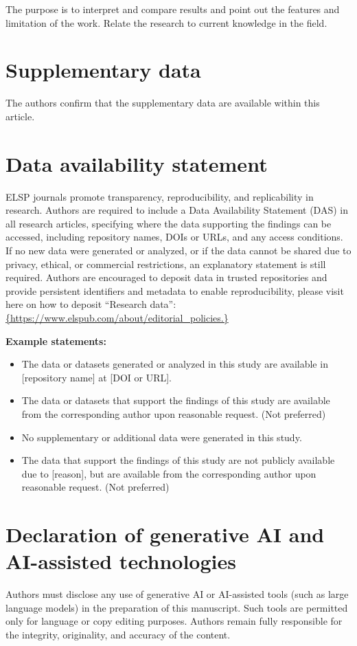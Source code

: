 \documentclass{ELSP}
\begin{document}
The purpose is to interpret and compare results and point out the
features and limitation of the work. Relate the research to current
knowledge in the field.

\section*{Supplementary data}

The authors confirm that the supplementary data are available within this article.

\section*{Data availability statement}
ELSP journals promote transparency, reproducibility, and replicability in research. Authors are required to include a Data Availability Statement (DAS) in all research articles, specifying where the data supporting the findings can be accessed, including repository names, DOIs or URLs, and any access conditions. If no new data were generated or analyzed, or if the data cannot be shared due to privacy, ethical, or commercial restrictions, an explanatory statement is still required. Authors are encouraged to deposit data in trusted repositories and provide persistent identifiers and metadata to enable reproducibility, please visit here on how to deposit “Research data”: \url{{https://www.elspub.com/about/editorial_policies.}}

\vspace{+12pt}
\noindent\textbf{{Example statements:}}
\vspace{+12pt}
\begin{itemize}
\item The data or datasets generated or analyzed in this study are available in [repository name] at [DOI or URL].
\item The data or datasets that support the findings of this study are available from the corresponding author upon reasonable request. (Not preferred)
\item No supplementary or additional data were generated in this study. 
\item The data that support the findings of this study are not publicly available due to [reason], but are available from the corresponding author upon reasonable request. (Not preferred) 
\end{itemize}

\section*{Declaration of generative AI and AI-assisted technologies}
Authors must disclose any use of generative AI or AI-assisted tools (such as large language models) in the preparation of this manuscript. Such tools are permitted only for language or copy editing purposes. Authors remain fully responsible for the integrity, originality, and accuracy of the content.
\end{document}
